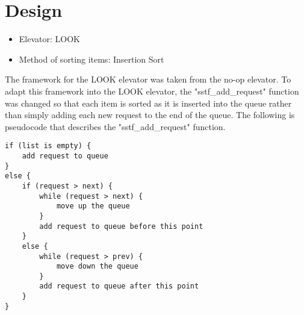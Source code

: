 \section{Design}
\begin{itemize}
\item Elevator: LOOK
\item Method of sorting items: Insertion Sort
\end{itemize}

The framework for the LOOK elevator was taken from the no-op elevator. To adapt this framework into the LOOK elevator, the "sstf\_add\_request" function was changed so that each item is sorted as it is inserted into the queue rather than simply adding each new request to the end of the queue. The following is pseudocode that describes the "sstf\_add\_request" function. 

\begin{lstlisting}[lineskip=3pt,keywords={if,else,while}]
if (list is empty) {
	add request to queue
}
else {
	if (request > next) {
		while (request > next) {
			move up the queue
		}
		add request to queue before this point
	}
	else {
		while (request > prev) {
			move down the queue
		}
		add request to queue after this point
	}
}		
\end{lstlisting}
